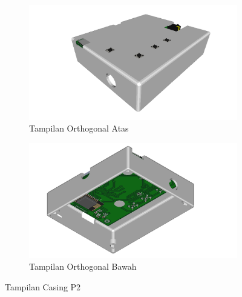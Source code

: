 \documentclass{book} %
\begin{document}
    \begin{figure}[!ht]
    	\centering
    	\begin{subfigure}[t]{0.45\textwidth}
    		\includegraphics[width=\textwidth]{images/p2_ortho_top}
    		\caption{Tampilan Orthogonal Atas}
    	\end{subfigure}
    	\begin{subfigure}[t]{0.45\textwidth}
    		\includegraphics[width=\textwidth]{images/p2_ortho_bot}
    		\caption{Tampilan Orthogonal Bawah}
    	\end{subfigure}
    	\caption{Tampilan Casing P2}
    \end{figure}
\end{document}
